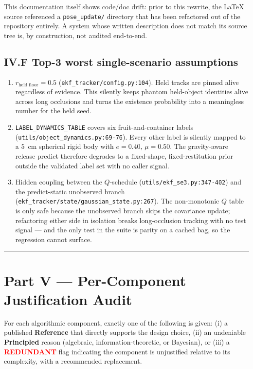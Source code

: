 \documentclass[11pt]{article}
\begin{document}
This documentation itself shows code/doc drift: prior to this rewrite, the
LaTeX source referenced a \texttt{pose\_update/} directory that has been
refactored out of the repository entirely. A system whose written
description does not match its source tree is, by construction, not
audited end-to-end.

\subsection*{IV.F Top-3 worst single-scenario assumptions}

\begin{enumerate}[leftmargin=1.5em,itemsep=2pt,topsep=2pt]
\item $r_{\text{held floor}}=0.5$ (\texttt{ekf\_tracker/config.py:104}).
  Held tracks are pinned alive regardless of evidence. This silently keeps
  phantom held-object identities alive across long occlusions and turns
  the existence probability into a meaningless number for the held seed.
\item \texttt{LABEL\_DYNAMICS\_TABLE} covers six fruit-and-container
  labels (\texttt{utils/object\_dynamics.py:69-76}). Every other label is
  silently mapped to a $5$~cm spherical rigid body with $e{=}0.40,\,
  \mu{=}0.50$. The gravity-aware release predict therefore degrades to
  a fixed-shape, fixed-restitution prior outside the validated label set
  with no caller signal.
\item Hidden coupling between the $Q$-schedule
  (\texttt{utils/ekf\_se3.py:347-402}) and the predict-static unobserved
  branch (\texttt{ekf\_tracker/state/gaussian\_state.py:267}). The
  non-monotonic $Q$ table is only safe because the unobserved branch
  skips the covariance update; refactoring either side in isolation
  breaks long-occlusion tracking with no test signal --- and the only
  test in the suite is parity on a cached bag, so the regression cannot
  surface.
\end{enumerate}

\bigskip\hrule\bigskip

\section*{Part V --- Per-Component Justification Audit}
\label{sec:audit}

For each algorithmic component, exactly one of the following is given:
(i) a published \textbf{Reference} that directly supports the design
choice, (ii) an undeniable \textbf{Principled} reason
(algebraic, information-theoretic, or Bayesian), or
(iii) a \textcolor{red}{\textbf{REDUNDANT}} flag indicating the
component is unjustified relative to its complexity, with a recommended
replacement.
\end{document}
